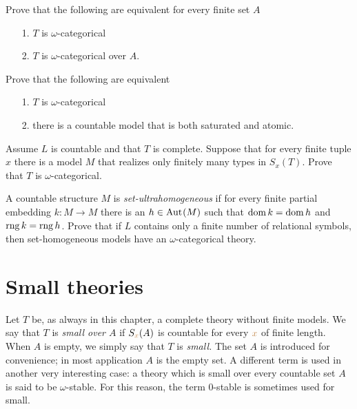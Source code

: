 \begin{exercise}\label{ex_omega_cat_overA}
Prove that the following are equivalent for every finite set $A$
\begin{itemize}   
\item[1.] $T$ is $\omega$-categorical
\item[2.] $T$ is $\omega$-categorical over $A$.
\end{itemize}
\end{exercise}

\begin{exercise}\label{ex_omega_cat_sat=atomic}
Prove that the following are equivalent
\begin{itemize}   
\item[1.] $T$ is $\omega$-categorical
\item[2.] there is a countable model that is both saturated and atomic. 
\end{itemize}
\end{exercise}

\begin{exercise} 
Assume $L$ is countable and that $T$ is complete.
Suppose that for every finite tuple $x$ there is a model $M$ that realizes only finitely many types in $S_x(T)$.
Prove that $T$ is $\omega$-categorical.
\end{exercise}

\begin{exercise}
A countable structure $M$ is \textit{set-ultrahomogeneous\/} if for every finite partial embedding $k:M\to M$ there is an $h\in{\rm Aut\kern.15ex}(M)$ such that $\mathop{\rm dom} k=\mathop{\rm dom} h$ and $\mathop{\rm rng} k=\mathop{\rm rng} h$.
Prove that if $L$ contains only a finite number of relational symbols, then set-homogeneous models have an $\omega$-categorical theory.
\end{exercise}

\section{Small theories}

\def\ceq#1#2#3{\parbox[b]{15ex}{$\displaystyle #1$}\parbox[b]{6ex}{\hfil$#2$}$\displaystyle #3$}

Let $T$ be, as always in this chapter, a complete theory without finite models.
We say that $T$ is \emph{small over $A$\/} if $S_{{\color{brown} x}}(A)$ is countable for every ${\color{brown} x}$ of finite length.
When $A$ is empty, we simply say that $T$ is \emph{small.}
The set $A$ is introduced for convenience; in most application $A$ is the empty set.
A different term is used in another very interesting case: a theory which is small over every countable set $A$ is said to be $\omega$-stable.
For this reason, the term $0$-stable is sometimes used for small.

